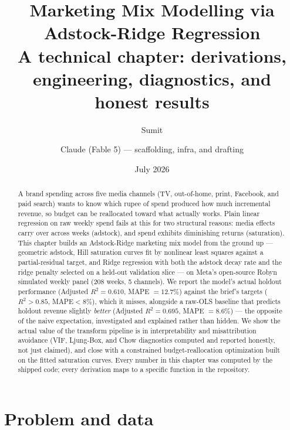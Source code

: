 \documentclass[11pt]{report}
\title{\textbf{Marketing Mix Modelling via Adstock-Ridge Regression}\\[6pt]
\large A technical chapter: derivations, engineering, diagnostics, and honest results}
\author{Sumit \and Claude (Fable 5) --- scaffolding, infra, and drafting}
\date{July 2026}
\begin{document}
\maketitle

\begin{abstract}
A brand spending across five media channels (TV, out-of-home, print, Facebook, and paid
search) wants to know which rupee of spend produced how much incremental revenue, so
budget can be reallocated toward what actually works. Plain linear regression on raw
weekly spend fails at this for two structural reasons: media effects carry over across
weeks (adstock), and spend exhibits diminishing returns (saturation). This chapter builds
an Adstock-Ridge marketing mix model from the ground up --- geometric adstock, Hill
saturation curves fit by nonlinear least squares against a partial-residual target, and
Ridge regression with both the adstock decay rate and the ridge penalty selected on a
held-out validation slice --- on Meta's open-source Robyn simulated weekly panel (208
weeks, 5 channels). We report the model's actual holdout performance (Adjusted
$R^2=0.610$, MAPE $=12.7\%$) against the brief's targets ($R^2>0.85$, MAPE$<8\%$),
which it misses, alongside a raw-OLS baseline that predicts holdout revenue slightly
\emph{better} (Adjusted $R^2=0.695$, MAPE $=8.6\%$) --- the opposite of the naive
expectation, investigated and explained rather than hidden. We show the actual value of
the transform pipeline is in interpretability and misattribution avoidance (VIF,
Ljung-Box, and Chow diagnostics computed and reported honestly, not just claimed), and
close with a constrained budget-reallocation optimization built on the fitted saturation
curves. Every number in this chapter was computed by the shipped code; every derivation
maps to a specific function in the repository.
\end{abstract}

\tableofcontents

\chapter{Problem and data}
\end{document}

